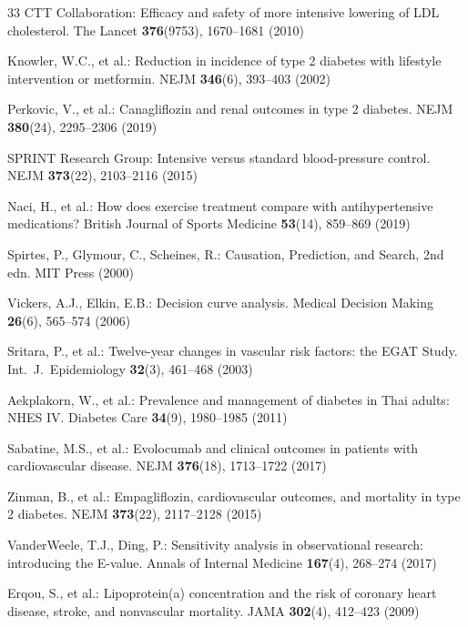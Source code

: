 \documentclass[runningheads]{llncs}
\begin{document}
\begin{thebibliography}{33}
CTT Collaboration:
Efficacy and safety of more intensive lowering of LDL cholesterol.
The Lancet \textbf{376}(9753), 1670--1681 (2010)

Knowler, W.C., et al.:
Reduction in incidence of type 2 diabetes with lifestyle intervention or metformin.
NEJM \textbf{346}(6), 393--403 (2002)

Perkovic, V., et al.:
Canagliflozin and renal outcomes in type 2 diabetes.
NEJM \textbf{380}(24), 2295--2306 (2019)

SPRINT Research Group:
Intensive versus standard blood-pressure control.
NEJM \textbf{373}(22), 2103--2116 (2015)

Naci, H., et al.:
How does exercise treatment compare with antihypertensive medications?
British Journal of Sports Medicine \textbf{53}(14), 859--869 (2019)

Spirtes, P., Glymour, C., Scheines, R.:
Causation, Prediction, and Search, 2nd edn.
MIT Press (2000)

Vickers, A.J., Elkin, E.B.:
Decision curve analysis.
Medical Decision Making \textbf{26}(6), 565--574 (2006)

Sritara, P., et al.:
Twelve-year changes in vascular risk factors: the EGAT Study.
Int.\ J.\ Epidemiology \textbf{32}(3), 461--468 (2003)

Aekplakorn, W., et al.:
Prevalence and management of diabetes in Thai adults: NHES IV.
Diabetes Care \textbf{34}(9), 1980--1985 (2011)

Sabatine, M.S., et al.:
Evolocumab and clinical outcomes in patients with cardiovascular disease.
NEJM \textbf{376}(18), 1713--1722 (2017)

Zinman, B., et al.:
Empagliflozin, cardiovascular outcomes, and mortality in type 2 diabetes.
NEJM \textbf{373}(22), 2117--2128 (2015)

VanderWeele, T.J., Ding, P.:
Sensitivity analysis in observational research: introducing the E-value.
Annals of Internal Medicine \textbf{167}(4), 268--274 (2017)

Erqou, S., et al.:
Lipoprotein(a) concentration and the risk of coronary heart disease,
stroke, and nonvascular mortality.
JAMA \textbf{302}(4), 412--423 (2009)


\end{thebibliography}
\end{document}
